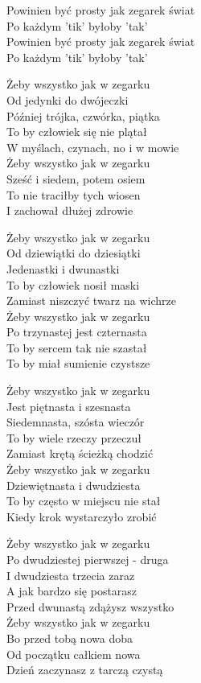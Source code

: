 \begin{text}
    Powinien być prosty jak zegarek świat\\
    Po każdym 'tik' byłoby 'tak'\\
    Powinien być prosty jak zegarek świat\\
    Po każdym 'tik' byłoby 'tak'

    Żeby wszystko jak w zegarku\\
    Od jedynki do dwójeczki\\
    Później trójka, czwórka, piątka\\
    To by człowiek się nie plątał\\
    W myślach, czynach, no i w mowie\\
    Żeby wszystko jak w zegarku\\
    Sześć i siedem, potem osiem\\
    To nie traciłby tych wiosen\\
    I zachował dłużej zdrowie

    Żeby wszystko jak w zegarku\\
    Od dziewiątki do dziesiątki\\
    Jedenastki i dwunastki\\
    To by człowiek nosił maski\\
    Zamiast niszczyć twarz na wichrze\\
    Żeby wszystko jak w zegarku\\
    Po trzynastej jest czternasta\\
    To by sercem tak nie szastał\\
    To by miał sumienie czystsze

    Żeby wszystko jak w zegarku\\
    Jest piętnasta i szesnasta\\
    Siedemnasta, szósta wieczór\\
    To by wiele rzeczy przeczuł\\
    Zamiast krętą ścieżką chodzić\\
    Żeby wszystko jak w zegarku\\
    Dziewiętnasta i dwudziesta\\
    To by często w miejscu nie stał\\
    Kiedy krok wystarczyło zrobić

    Żeby wszystko jak w zegarku\\
    Po dwudziestej pierwszej - druga\\
    I dwudziesta trzecia zaraz\\
    A jak bardzo się postarasz\\
    Przed dwunastą zdążysz wszystko\\
    Żeby wszystko jak w zegarku\\
    Bo przed tobą nowa doba\\
    Od początku całkiem nowa\\
    Dzień zaczynasz z tarczą czystą
\end{text}
